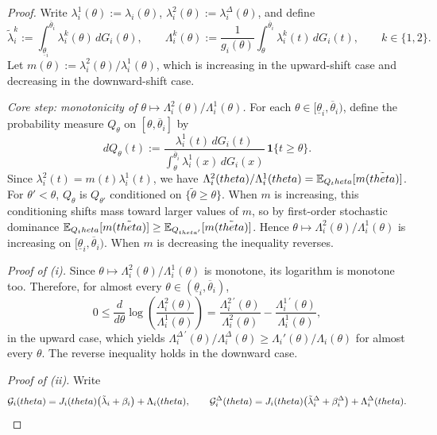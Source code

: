 \documentclass{class}
\begin{document}
\begin{proof}
Write $\lambda_i^1(\theta):=\lambda_i(\theta)$, $\lambda_i^2(\theta):=\lambda_i^\Delta(\theta)$, and define
\[
\tilde\lambda_i^k := \int_{\underline\theta_i}^{\overline\theta_i}\lambda_i^k(\theta)\,dG_i(\theta), \qquad \Lambda_i^k(\theta) := \frac{1}{g_i(\theta)}\int_\theta^{\overline\theta_i}\lambda_i^k(t)\,dG_i(t), \qquad k\in\{1,2\}.
\]
Let $m(\theta):=\lambda_i^2(\theta)/\lambda_i^1(\theta)$, which is increasing in the upward-shift case and decreasing in the downward-shift case.


\noindent\textit{Core step: monotonicity of $\theta\mapsto\Lambda_i^2(\theta)/\Lambda_i^1(\theta)$.}
For each $\theta\in[\underline\theta_i,\overline\theta_i)$, define the probability measure $Q_\theta$ on $[\theta,\overline\theta_i]$ by
\[
dQ_\theta(t) := \frac{\lambda_i^1(t)\,dG_i(t)}{\displaystyle\int_\theta^{\overline\theta_i}\lambda_i^1(x)\,dG_i(x)}\,\mathbf{1}\{t\ge\theta\}.
\]
Since $\lambda_i^2(t)=m(t)\lambda_i^1(t)$, we have $\Lambda_i^2(theta)/\Lambda_i^1(theta) = \mathbb{E}_{Q_theta}[m(\tilde{theta})]$. For $\theta'<\theta$, $Q_\theta$ is $Q_{\theta'}$ conditioned on $\{\tilde\theta\ge\theta\}$. When $m$ is increasing, this conditioning shifts mass toward larger values of $m$, so by first-order stochastic dominance $\mathbb{E}_{Q_theta}[m(\tilde{theta})] \ge \mathbb{E}_{Q_{theta'}}[m(\tilde{theta})]$. Hence $\theta\mapsto\Lambda_i^2(\theta)/\Lambda_i^1(\theta)$ is increasing on $[\underline\theta_i,\overline\theta_i)$. When $m$ is decreasing the inequality reverses.


\noindent\textit{Proof of (i).}
Since $\theta\mapsto\Lambda_i^2(\theta)/\Lambda_i^1(\theta)$ is monotone, its logarithm is monotone too. Therefore, for almost every $\theta\in(\underline\theta_i,\overline\theta_i)$,
\[
0 \le \frac{d}{d\theta}\log\!\left(\frac{\Lambda_i^2(\theta)}{\Lambda_i^1(\theta)}\right) = \frac{\Lambda_i^{2\,\prime}(\theta)}{\Lambda_i^2(\theta)} - \frac{\Lambda_i^{1\,\prime}(\theta)}{\Lambda_i^1(\theta)},
\]
in the upward case, which yields $\Lambda_i^{\Delta\,\prime}(\theta)/\Lambda_i^\Delta(\theta) \ge \Lambda_i'(\theta)/\Lambda_i(\theta)$ for almost every $\theta$. The reverse inequality holds in the downward case.


\noindent\textit{Proof of (ii).}
Write
\[
\mathcal{G}_i(theta) = J_i(theta)\bigl(\tilde\lambda_i+\beta_i\bigr)+\Lambda_i(theta), \qquad \mathcal{G}_i^\Delta(theta) = J_i(theta)\bigl(\tilde\lambda_i^\Delta+\beta_i^{\Delta}\bigr)+\Lambda_i^\Delta(theta).
\]



\end{proof}
\end{document}
